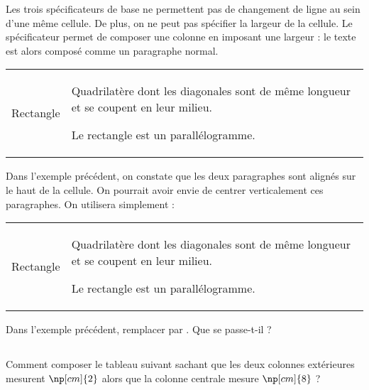 Les trois spécificateurs de base ne permettent pas de changement de ligne au sein d'une même cellule. De plus, on ne peut pas spécifier la largeur de la cellule. Le spécificateur  permet de composer une colonne en imposant une largeur : le texte est alors composé comme un paragraphe normal. \bigskip

{\NewFont
\begin{SideBySideExample}
    \begin{tabular}{r|p{4.5cm}}
        Rectangle & Quadrilat\`ere dont les diagonales
        sont de m\^eme longueur et
        se coupent en leur milieu.\par
        Le rectangle est un parall\'elogramme.
    \end{tabular}
\end{SideBySideExample}
}\bigskip

Dans l'exemple précédent, on constate que les deux paragraphes sont alignés sur le haut de la cellule. On pourrait avoir envie de centrer verticalement ces paragraphes. On utilisera simplement  :\bigskip

{\NewFont
\begin{SideBySideExample}
    \begin{tabular}{r|m{4.5cm}}
        Rectangle & Quadrilat\`ere dont les diagonales
        sont de m\^eme longueur et
        se coupent en leur milieu.\par
        Le rectangle est un parall\'elogramme.
    \end{tabular}
\end{SideBySideExample}
}\bigskip

\begin{info}
    Dans l'exemple précédent, remplacer  par . Que se passe-t-il ?
\end{info}

\subsection*{\ExoFiche}
Comment composer le tableau suivant  sachant que les deux colonnes extérieures mesurent $\np[cm]{2}$ alors que la colonne centrale mesure $\np[cm]{8}$ ?\bigskip

